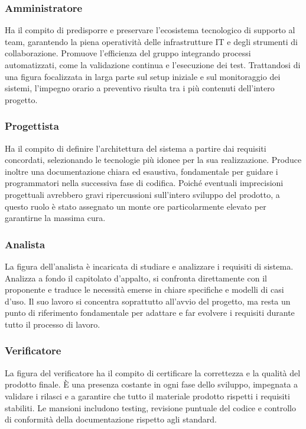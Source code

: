\documentclass[a4paper,12pt]{article}
\begin{document}
\subsubsection{Amministratore}
Ha il compito di predisporre e preservare l'ecosistema tecnologico di supporto al team, garantendo la piena operatività delle infrastrutture IT e degli strumenti di collaborazione. Promuove l'efficienza del gruppo integrando processi automatizzati, come la validazione continua e l'esecuzione dei test. Trattandosi di una figura focalizzata in larga parte sul setup iniziale e sul monitoraggio dei sistemi, l'impegno orario a preventivo risulta tra i più contenuti dell'intero progetto.

\subsubsection{Progettista}
Ha il compito di definire l'architettura del sistema a partire dai requisiti concordati, selezionando le tecnologie più idonee per la sua realizzazione. Produce inoltre una documentazione chiara ed esaustiva, fondamentale per guidare i programmatori nella successiva fase di codifica. Poiché eventuali imprecisioni progettuali avrebbero gravi ripercussioni sull'intero sviluppo del prodotto, a questo ruolo è stato assegnato un monte ore particolarmente elevato per garantirne la massima cura.

\subsubsection{Analista}
La figura dell'analista è incaricata di studiare e analizzare i requisiti di sistema. Analizza a fondo il capitolato d'appalto, si confronta direttamente con il proponente e traduce le necessità emerse in chiare specifiche e modelli di casi d'uso. Il suo lavoro si concentra soprattutto all'avvio del progetto, ma resta un punto di riferimento fondamentale per adattare e far evolvere i requisiti durante tutto il processo di lavoro.

\subsubsection{Verificatore}
La figura del verificatore ha il compito di certificare la correttezza e la qualità del prodotto finale. È una presenza costante in ogni fase dello sviluppo, impegnata a validare i rilasci e a garantire che tutto il materiale prodotto rispetti i requisiti stabiliti. Le mansioni includono testing, revisione puntuale del codice e controllo di conformità della documentazione rispetto agli standard. 
\end{document}
